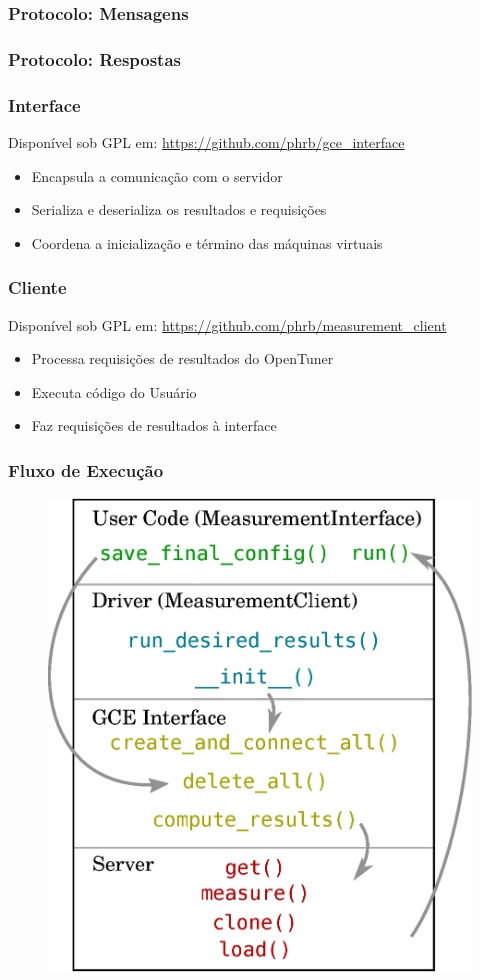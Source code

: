 \documentclass[10pt, compress]{beamer}
\begin{document}
\begin{frame}[fragile]
  \frametitle{Protocolo: Mensagens}
  
\end{frame}

\begin{frame}[fragile]
  \frametitle{Protocolo: Respostas}
  
\end{frame}

\begin{frame}[fragile]
    \frametitle{Interface}
    Disponível sob GPL em:
    \url{https://github.com/phrb/gce_interface}
    \begin{itemize}
        \item \alert{Encapsula} a comunicação com o servidor
        \item \alert{Serializa e deserializa} os resultados e requisições
        \item \alert{Coordena} a inicialização e término das máquinas
            virtuais
    \end{itemize}
\end{frame}

\begin{frame}[fragile]
    \frametitle{Cliente}
    Disponível sob GPL em:
    \url{https://github.com/phrb/measurement_client}
    \begin{itemize}
        \item \alert{Processa} requisições de 
            resultados do OpenTuner
        \item \alert{Executa} código do Usuário
        \item Faz \alert{requisições} de resultados à interface
    \end{itemize}
\end{frame}

\begin{frame}[fragile]
  \frametitle{Fluxo de Execução}
  \begin{figure}[H]
      \centering
      \includegraphics[width=.5\textwidth]{interfaceflow_simple}
  \end{figure}
\end{frame}
\end{document}
